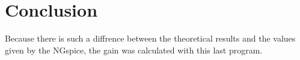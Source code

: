 \section{Conclusion}
\label{sec:conclusion}

Because there is such a diffrence between the theoretical results and the values given by the NGspice, the gain was calculated with this last program.
 

